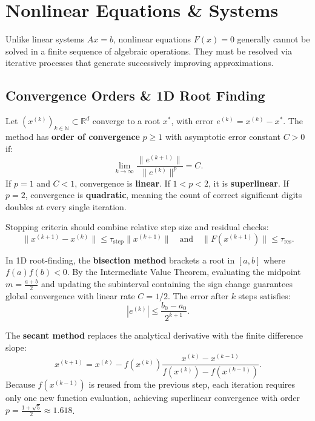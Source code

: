 \section{Nonlinear Equations \& Systems}

Unlike linear systems $A x = b$, nonlinear equations $F(x) = 0$ generally cannot be solved in a finite sequence of algebraic operations. They must be resolved via iterative processes that generate successively improving approximations.

\subsection{Convergence Orders \& 1D Root Finding}

\begin{definition}
    Let $(x^{(k)})_{k \in \mathbb{N}} \subset \mathbb{R}^d$ converge to a root $x^*$, with error $e^{(k)} = x^{(k)} - x^*$. The method has \textbf{order of convergence} $p \ge 1$ with asymptotic error constant $C > 0$ if:
    \begin{equation}
        \lim_{k \to \infty} \frac{\|e^{(k+1)}\|}{\|e^{(k)}\|^p} = C.
    \end{equation}
    If $p = 1$ and $C < 1$, convergence is \textbf{linear}. If $1 < p < 2$, it is \textbf{superlinear}. If $p = 2$, convergence is \textbf{quadratic}, meaning the count of correct significant digits doubles at every single iteration.
\end{definition}

Stopping criteria should combine relative step size and residual checks:
\begin{equation}
    \|x^{(k+1)} - x^{(k)}\| \le \tau_{\text{step}} \|x^{(k+1)}\| \quad \text{and} \quad \|F(x^{(k+1)})\| \le \tau_{\text{res}}.
\end{equation}

In 1D root-finding, the \textbf{bisection method} brackets a root in $[a, b]$ where $f(a) f(b) < 0$. By the Intermediate Value Theorem, evaluating the midpoint $m = \frac{a+b}{2}$ and updating the subinterval containing the sign change guarantees global convergence with linear rate $C = 1/2$. The error after $k$ steps satisfies:
\begin{equation}
    |e^{(k)}| \le \frac{b_0 - a_0}{2^{k+1}}.
\end{equation}

The \textbf{secant method} replaces the analytical derivative with the finite difference slope:
\begin{equation}
    x^{(k+1)} = x^{(k)} - f(x^{(k)}) \frac{x^{(k)} - x^{(k-1)}}{f(x^{(k)}) - f(x^{(k-1)})}.
\end{equation}
Because $f(x^{(k-1)})$ is reused from the previous step, each iteration requires only one new function evaluation, achieving superlinear convergence with order $p = \frac{1 + \sqrt{5}}{2} \approx 1.618$.


